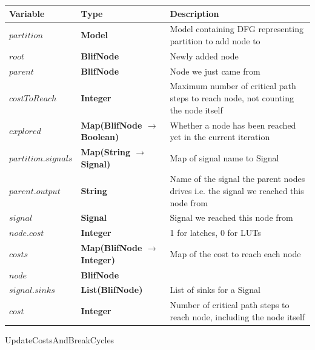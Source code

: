 \documentclass[12pt,final,oneside,a4paper]{dwThesis} %
\begin{document}
   \begin{algorithm}

      \begin{center}

         \begin{tabularx}
            {\linewidth}{llX} \toprule
            Variable & Type & Description\\
            \midrule $partition$ &\textbf{Model } &  Model containing DFG representing partition to add
            node to\\
            $root$ &\textbf{BlifNode } &  Newly added node\\

            $parent$ &\textbf{BlifNode } &  Node we just came from\\

            $costToReach$ &\textbf{Integer } &  Maximum number of critical
            path steps to reach node, not counting the node itself \\

            $explored$ &\textbf{Map(BlifNode $\to$ Boolean) } &  Whether a
            node has been reached yet in the current iteration \\

            $partition.signals$ &\textbf{Map(String $\to$ Signal) } &  Map
            of signal name to Signal \\
            $parent.output$ &\textbf{String } &
            Name of the signal the parent nodes drives i.e. the signal we
            reached this node from\\
            $signal$ & \textbf{Signal } &  Signal we
            reached this node from\\
            $node.cost$ &\textbf{Integer } &  1 for
            latches, 0 for LUTs \\
            $costs$ &\textbf{Map(BlifNode $\to$
               Integer) } &  Map of the cost to reach each node \\
            $node$
            &\textbf{BlifNode } &  \\
            $signal.sinks$ &\textbf{List(BlifNode) } &  List of sinks for a Signal \\
            $cost$
            &\textbf{Integer } &  Number of critical path steps to reach node,
            including the node itself \\
            \bottomrule 
         \end{tabularx}


      \end{center}
      \caption{UpdateCostsAndBreakCycles}\label{updatecosts}


\end{algorithm}
\end{document}
